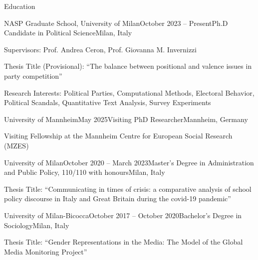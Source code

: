 \documentclass{cv} %
\begin{document}

\begin{rSection}{Education}

\begin{rSubsection}{NASP Graduate School, University of Milan}{October 2023 -- Present}{Ph.D Candidate in Political Science}{Milan, Italy}
\item Supervisors: Prof. Andrea Ceron, Prof. Giovanna M. Invernizzi
\item Thesis Title (Provisional): “The balance between positional and valence issues in party competition”
\item Research Interests: Political Parties, Computational Methods, Electoral Behavior, Political Scandals, Quantitative Text Analysis, Survey Experiments
\end{rSubsection}

\begin{rSubsection}{University of Mannheim}{May 2025}{Visiting PhD Researcher}{Mannheim, Germany}
\item Visiting Fellowship at the Mannheim Centre for European Social Research (MZES)
\end{rSubsection}

\begin{rSubsection}{University of Milan}{October 2020 -- March 2023}{Master's Degree in Administration and Public Policy, 110/110 with honours}{Milan, Italy}
\item Thesis Title: “Communicating in times of crisis: a comparative analysis of school policy discourse in Italy and Great Britain during the covid-19 pandemic”
\end{rSubsection}

\begin{rSubsection}{University of Milan-Bicocca}{October 2017 -- October 2020}{Bachelor's Degree in Sociology}{Milan, Italy}
\item Thesis Title: “Gender Representations in the Media: The Model of the Global Media Monitoring Project”
\end{rSubsection}

\end{rSection}
\end{document}
